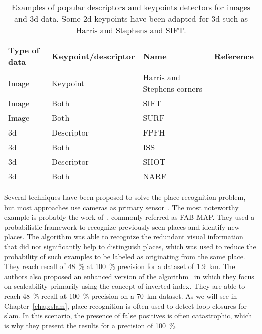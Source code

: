 \begin{table}[htb]
    \centering
    \begin{tabular}{@{}llll@{}}
        \toprule
        \textbf{Type of data}  & \textbf{Keypoint/descriptor} & \textbf{Name}               & \textbf{Reference} \\
        \hline
        Image                  & Keypoint                     & Harris and Stephens corners & \citep{Harris1988}  \\
        Image                  & Both                         & SIFT                        & \citep{Lowe2004}    \\
        Image                  & Both                         & SURF                        & \citep{Bay2006}     \\
        \gls*{3d}              & Descriptor                   & FPFH                        & \citep{Rusu2009}    \\
        \gls*{3d}              & Both                         & ISS                         & \citep{Yu2009}      \\
        \gls*{3d}              & Descriptor                   & SHOT                        & \citep{Tombari2010} \\
        \gls*{3d}              & Both                         & NARF                        & \citep{Steder2011a} \\
        \bottomrule
    \end{tabular}
    \caption[Examples of popular descriptors and keypoints detectors for images and \gls*{3d} data.]{Examples of popular descriptors and keypoints detectors for images and \gls*{3d} data. Some \gls*{2d} keypoints have been adapted for \gls*{3d} such as Harris and Stephens and SIFT.}
    \label{tab:features_examples}
\end{table}

Several techniques have been proposed to solve the place recognition problem, but most approaches use cameras as primary sensor~\citep{Torralba2003, Ulrich2000}. The most noteworthy example is probably the work of~\citet{Cummins2008}, commonly referred as FAB-MAP. They used a probabilistic framework to recognize previously seen places and identify new places. The algorithm was able to recognize the redundant visual information that did not significantly help to distinguish places, which was used to reduce the probability of such examples to be labeled as originating from the same place. They reach recall of \SI{48}{\percent} at \SI{100}{\percent} precision for a dataset of \SI{1.9}{\kilo\meter}. The authors also proposed an enhanced version of the algorithm~\citep{Cummins2011} in which they focus on scaleability primarily using the concept of inverted index. They are able to reach \SI{48}{\percent} recall at \SI{100}{\percent} precision on a \SI{70}{\kilo\meter} dataset. As we will see in Chapter~\ref{chap:slam}, place recognition is often used to detect loop closures for \gls*{slam}. In this scenario, the presence of false positives is often catastrophic, which is why they present the results for a precision of \SI{100}{\percent}.

